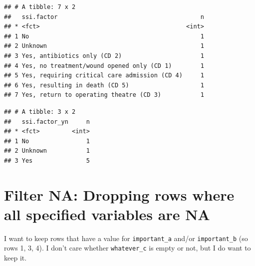 \documentclass[
]{book}
\newenvironment{Shaded}{\begin{snugshade}}{\end{snugshade}}
\newcommand{\CommentTok}[1]{\textcolor[rgb]{0.56,0.35,0.01}{\textit{#1}}}
\newcommand{\DataTypeTok}[1]{\textcolor[rgb]{0.13,0.29,0.53}{#1}}
\newcommand{\KeywordTok}[1]{\textcolor[rgb]{0.13,0.29,0.53}{\textbf{#1}}}
\newcommand{\NormalTok}[1]{#1}
\newcommand{\OperatorTok}[1]{\textcolor[rgb]{0.81,0.36,0.00}{\textbf{#1}}}
\newcommand{\StringTok}[1]{\textcolor[rgb]{0.31,0.60,0.02}{#1}}
\begin{document}
\begin{verbatim}
## # A tibble: 7 x 2
##   ssi.factor                                        n
## * <fct>                                         <int>
## 1 No                                                1
## 2 Unknown                                           1
## 3 Yes, antibiotics only (CD 2)                      1
## 4 Yes, no treatment/wound opened only (CD 1)        1
## 5 Yes, requiring critical care admission (CD 4)     1
## 6 Yes, resulting in death (CD 5)                    1
## 7 Yes, return to operating theatre (CD 3)           1
\end{verbatim}

\begin{Shaded}
\end{Shaded}

\begin{verbatim}
## # A tibble: 3 x 2
##   ssi.factor_yn     n
## * <fct>         <int>
## 1 No                1
## 2 Unknown           1
## 3 Yes               5
\end{verbatim}

\hypertarget{filter-na-dropping-rows-where-all-specified-variables-are-na}{%
\section{Filter NA: Dropping rows where all specified variables are NA}\label{filter-na-dropping-rows-where-all-specified-variables-are-na}}

I want to keep rows that have a value for \texttt{important\_a} and/or \texttt{important\_b} (so rows 1, 3, 4).
I don't care whether \texttt{whatever\_c} is empty or not, but I do want to keep it.
\end{document}
